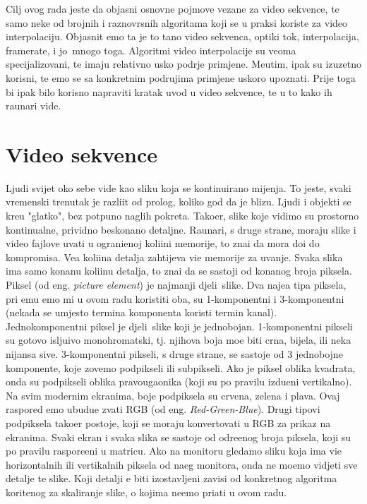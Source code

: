 Cilj ovog rada jeste da objasni osnovne pojmove vezane za video sekvence, te samo neke od brojnih i raznovrsnih algoritama koji se u praksi koriste za video interpolaciju. Objasnit \cj emo \sh ta je to ta\ch no video sekvenca, opti\ch ki tok,
interpolacija, framerate, i jo\sh\ mnogo toga. Algoritmi video interpolacije su veoma specijalizovani, te imaju relativno usko podr\ch je primjene. Me\dj utim, ipak su izuzetno korisni, te \cj emo se sa konkretnim podru\ch jima primjene uskoro
upoznati. Prije toga bi ipak bilo korisno napraviti kratak uvod u video sekvence, te u to kako ih ra\ch unari vide.

\section{Video sekvence}
Ljudi svijet oko sebe vide kao sliku koja se kontinuirano mijenja. To jeste, svaki vremenski trenutak je razli\ch it od pro\sh log, koliko god da je blizu. Ljudi i objekti se kre\cj u "glatko", bez potpuno naglih pokreta. Tako\dj er, slike koje vidimo
su prostorno kontinualne, prividno beskona\ch no detaljne. Ra\ch unari, s druge strane, moraju slike i video fajlove \ch uvati u ograni\ch enoj koli\ch ini memorije, \sh to zna\ch i da mora do\cj i do kompromisa. Ve\cj a koli\ch ina detalja
zahtijeva vi\sh e memorije za \ch uvanje. Svaka slika ima samo kona\ch nu koli\ch inu detalja, \sh to zna\ch i da se sastoji od kona\ch nog broja piksela. Piksel (od eng. \textit{picture element}) je najmanji djeli\cj\ slike. Dva naj\ch e\sh \cj a tipa piksela,
pri \ch emu \cj emo mi u ovom radu koristiti oba, su 1-komponentni i 3-komponentni (nekada se umjesto termina komponenta koristi termin kanal). Jednokomponentni piksel je  djeli\cj\ slike koji je jednobojan. 1-komponentni pikseli su
gotovo islju\ch ivo monohromatski, tj. njihova boja mo\zh e biti crna, bijela, ili neka nijansa sive. 3-komponentni pikseli, s druge strane, se sastoje od 3 jednobojne komponente, koje zovemo podpikseli ili subpikseli. Ako je piksel oblika kvadrata,
onda su podpikseli oblika pravougaonika (koji su po pravilu izdu\zh eni vertikalno). Na svim modernim ekranima, boje podpiksela su crvena, zelena i plava. Ovaj raspored \cj emo ubudu\cj e zvati RGB (od eng. \textit{Red-Green-Blue}). Drugi tipovi podpiksela
 tako\dj er postoje, koji se moraju konvertovati u RGB za prikaz na ekranima.
Svaki ekran i svaka slika se sastoje od odre\dj enog broja piksela, koji su po pravilu raspore\dj eni u matricu. Ako na monitoru
gledamo sliku koja ima vi\sh e horizontalnih ili vertikalnih piksela od na\sh eg monitora, onda ne mo\zh emo vidjeti sve detalje te slike. Koji detalji \cj e biti izostavljeni zavisi od konkretnog algoritma kori\sh tenog za skaliranje slike, o kojima
ne\cj emo pri\ch ati u ovom radu.

